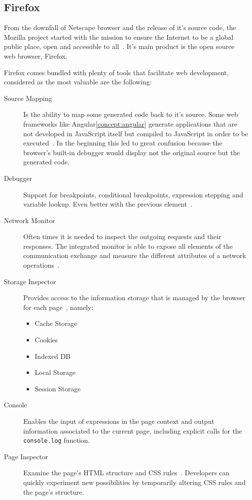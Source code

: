 \subsection{Firefox}
From the downfall of Netscape browser and the release of it's source code, the Mozilla project started with the mission to ensure the Internet to be a global public place, open and accessible to all~\cite{firemission}. It's main product is the open source web browser, Firefox.

Firefox comes bundled with plenty of tools that facilitate web development, considered as the most valuable are the following:
\begin{description}
\item [Source Mapping] Is the ability to map some generated code back to it's source. Some web frameworks like Angular\ref{concept:angular} generate applications that are not developed in JavaScript itself but compiled to JavaScript in order to be executed~\cite{srcmapping}. In the beginning this led to great confusion because the browser's built-in debugger would display not the original source but the generated code.
\item [Debugger] Support for breakpoints, conditional breakpoints, expression stepping and variable lookup. Even better with the previous element~\cite{dbgmodernweb}.
\item [Network Monitor] Often times it is needed to inspect the outgoing requests and their responses. The integrated monitor is able to expose all elements of the communication exchange and measure the different attributes of a network operations~\cite{networkmon}.
\item [Storage Inspector] Provides access to the information storage that is managed by the browser for each page~\cite{storageinspector}, namely:
  \begin{itemize}
  \item Cache Storage
  \item Cookies
  \item Indexed \gls{DB}
  \item Local Storage
  \item Session Storage
  \end{itemize}
\item [Console] Enables the input of expressions in the page context and output information associated to the current page, including explicit calls for the \texttt{console.log} function.
\item [Page Inspector] Examine the page's \gls{HTML} structure and \gls{CSS} rules~\cite{inspector}. Developers can quickly experiment new possibilities by temporarily altering \gls{CSS} rules and the page's structure.
\end{description}


